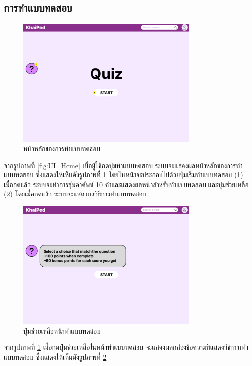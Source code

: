 \documentclass[12pt,oneside,openright,a4paper]{cpe-thai-project}
\begin{document}
\pagebreak
\subsection{การทำแบบทดสอบ}
\begin{figure}[!h]\centering
	\includegraphics[width=0.8\textwidth, keepaspectratio=true]{image/chap3/ui/quiz/Quiz.png}
	\caption{หน้าหลักของการทำแบบทดสอบ}\label{fig:UI_Quiz}
\end{figure}
\hspace{1cm}
จากรูปภาพที่ \ref{fig:UI_Home} เมื่อผู้ใช้กดปุ่มทำแบบทดสอบ ระบบจะแสดงผลหน้าหลักของการทำแบบทดสอบ ซึ่งแสดงให้เห็นดังรูปภาพที่ \ref{fig:UI_Quiz}
โดยในหน้าจะประกอบไปด้วยปุ่มเริ่มทำแบบทดสอบ (1) เมื่อกดแล้ว ระบบจะทำการสุ่มคำศัพท์ 10 คำและแสดงผลหน้าสำหรับทำแบบทดสอบ
และปุ่มช่วยเหลือ (2) โดยเมื่อกดแล้ว ระบบจะแสดงผลวิธีการทำแบบทดสอบ

\begin{figure}[!h]\centering
	\includegraphics[width=0.8\textwidth, keepaspectratio=true]{image/chap3/ui/quiz/Quiz - Help.png}
	\caption{ปุ่มช่วยเหลือหน้าทำแบบทดสอบ}\label{fig:UI_QuizHelp}
\end{figure}
\hspace{1cm}
จากรูปภาพที่ \ref{fig:UI_Quiz} เมื่อกดปุ่มช่วยเหลือในหน้าทำแบบทดสอบ จะแสดงผลกล่องข้อความที่แสดงวิธีการเทำแบบทดสอบ ซึ่งแสดงให้เห็นดังรูปภาพที่ \ref{fig:UI_QuizHelp}
\end{document}
